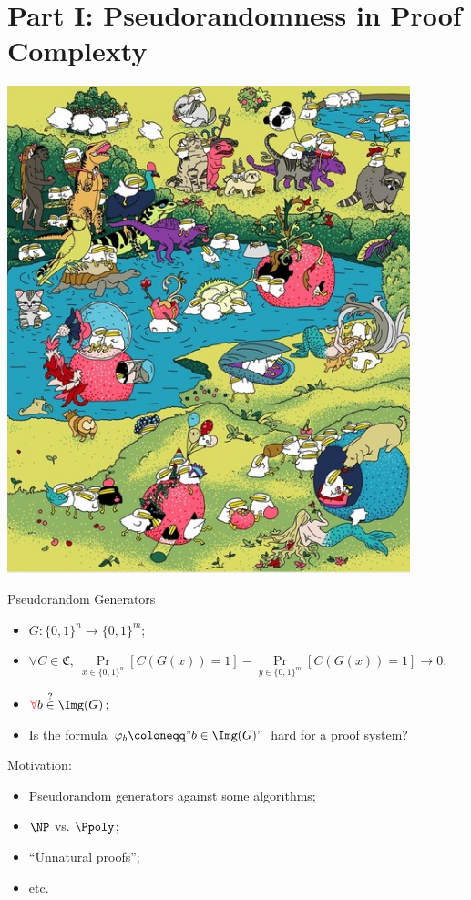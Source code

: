 \section{Part I: Pseudorandomness in Proof Complexty}

\begin{frame}
    \centering
    \insertsectionhead

    \vspace{0.3cm}
    \includegraphics[scale = 0.3]{pics/utia-garden.png}
\end{frame}

\begin{frame}{Pseudorandom Generators}

    \begin{itemize}
        \item $G\colon \{0, 1\}^n \to \{0, 1\}^m$;
            \pause
        \item $\forall C \in \mathfrak{C}, ~ \Pr\limits_{x \in \{0, 1\}^n}[C(G(x)) = 1] - \Pr\limits_{y
            \in \{0, 1\}^m}[C(G(x)) = 1]
            \to 0$;
            \pause
        \item $\textcolor{red}{\forall}b \stackrel{?}{\in} \Img(G)$;
            \pause
        \item Is the formula $\varphi_b \coloneqq "b \in \Img(G)"$ hard for a proof system?          
    \end{itemize}

    \pause
    \vspace{0.3cm}
    Motivation:
    \begin{itemize}
        \item Pseudorandom generators against some algorithms;
        \item $\NP$ vs. $\Ppoly$;
        \item ``Unnatural proofs'';
        \item etc. 
    \end{itemize}
\end{frame}


